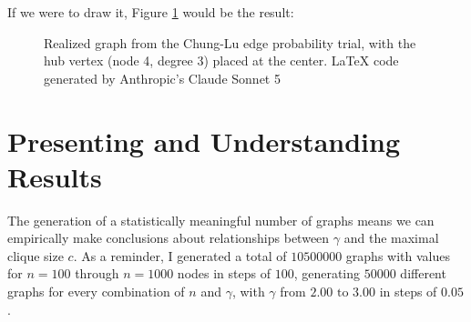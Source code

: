 \documentclass[12pt, a4paper]{article}   %
\begin{document}
If we were to draw it, Figure \ref{fig:chung-lu-realization-3} would be the result:

\begin{figure}[H]
\centering
{}
\caption{Realized graph from the Chung-Lu edge probability trial, with the hub vertex (node 4, degree 3) placed at the center. LaTeX code generated by Anthropic's Claude Sonnet 5}
\label{fig:chung-lu-realization-3}
\end{figure}

\section{Presenting and Understanding Results} \label{sec:presenting-understanding-results}


The generation of a statistically meaningful number of graphs means we can empirically make conclusions about relationships between \( \gamma \) and the maximal clique size \( c \). As a reminder, I generated a total of \(\num{10500000}\) graphs with values for \( n =100\) through \( n =1000\) nodes in steps of \(\num{100} \), generating \(\num{50000}\) different graphs for every combination of \( n \) and \( \gamma \), with \( \gamma \) from \(2.00 \text{ to } 3.00\) in steps of \(0.05 \).
\end{document}
